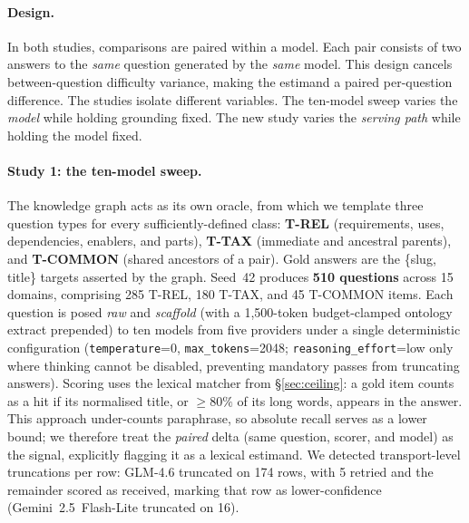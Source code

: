 \documentclass[10pt,twocolumn]{article}
\begin{document}
\paragraph{Design.} In both studies, comparisons are paired within a model. Each pair consists of two answers to the \emph{same} question generated by the \emph{same} model. This design cancels between-question difficulty variance, making the estimand a paired per-question difference. The studies isolate different variables. The ten-model sweep varies the \emph{model} while holding grounding fixed. The new study varies the \emph{serving path} while holding the model fixed.

\paragraph{Study 1: the ten-model sweep.} The knowledge graph acts as its own oracle, from which we template three question types for every sufficiently-defined class: \textbf{T-REL} (requirements, uses, dependencies, enablers, and parts), \textbf{T-TAX} (immediate and ancestral parents), and \textbf{T-COMMON} (shared ancestors of a pair). Gold answers are the \{slug, title\} targets asserted by the graph. Seed~42 produces \textbf{510 questions} across 15 domains, comprising 285 T-REL, 180 T-TAX, and 45 T-COMMON items. Each question is posed \emph{raw} and \emph{scaffold} (with a 1{,}500-token budget-clamped ontology extract prepended) to ten models from five providers under a single deterministic configuration (\texttt{temperature}=0, \texttt{max\_tokens}=2048; \texttt{reasoning\_effort}=low only where thinking cannot be disabled, preventing mandatory passes from truncating answers). Scoring uses the lexical matcher from \S\ref{sec:ceiling}: a gold item counts as a hit if its normalised title, or $\geq80\%$ of its long words, appears in the answer. This approach under-counts paraphrase, so absolute recall serves as a lower bound; we therefore treat the \emph{paired} delta (same question, scorer, and model) as the signal, explicitly flagging it as a lexical estimand. We detected transport-level truncations per row: GLM-4.6 truncated on 174 rows, with 5 retried and the remainder scored as received, marking that row as lower-confidence (Gemini~2.5~Flash-Lite truncated on 16).
\end{document}
